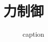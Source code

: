 \chapter{力制御}

\begin{figure}[t]
    \centering
        
        \caption{caption}
        \label{fig:figlabel}
\end{figure}